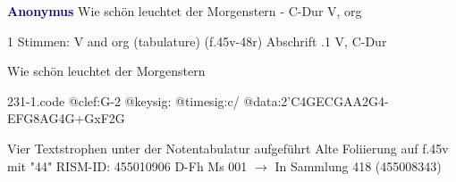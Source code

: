 \documentclass[twocolumn]{book}
\begin{document}
\newline \par \vspace{7pt} \textcolor{darkblue}{\textbf{Anonymus  }}
\newline Wie schön leuchtet der Morgenstern - C-Dur
\newline V, org
\newline \begin{itshape}\end{itshape} 
\newline \textcolor{darkblue}{}  1 Stimmen: V and org (tabulature)  (f.45v-48r)
\newline Abschrift
.1  V, C-Dur
\newline \begin{footnotesize} Wie schön leuchtet der Morgenstern \end{footnotesize}  
\begin{filecontents*}{231-1.code}
@clef:G-2
@keysig:
@timesig:c/
@data:2'C4GECGAA2G4-EFG{8AG}4G+GxF2G
\end{filecontents*}
\newline
%
\newline Vier Textstrophen unter der Notentabulatur aufgeführt
\newline Alte Foliierung auf f.45v mit "44"
\newline RISM-ID: 455010906
\newline D-Fh  Ms 001
\newline $\rightarrow$ In Sammlung 418 (455008343)
      
\end{document}
